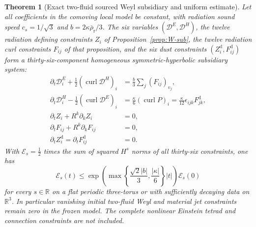 \documentclass[11pt,a4paper]{article}
\newtheorem{theorem}{Theorem}
\begin{document}
\begin{theorem}[Exact two-fluid sourced
Weyl subsidiary and uniform estimate]
\label{thm:36}
Let all coefficients in the
comoving local model be constant,
with radiation sound speed
$c_s=1/\sqrt3$ and
$b=2\kappa\bar\rho_{\mathrm r}/3$.
The six variables
$(\mathcal D^E,\mathcal D^H)$,
the twelve radiation defining
constraints $Z_i$ of
Proposition~\ref{prop:W-sub},
the twelve radiation curl constraints
$F_{ij}$ of that proposition,
and the six dust constraints
$(Z_i^{\mathrm d},F_{ij}^{\mathrm d})$
form a thirty-six-component
homogeneous symmetric-hyperbolic
subsidiary system:
\begin{equation}\label{eq:36subs}
\begin{aligned}
\partial_t\mathcal D^E_i
+\tfrac12(\operatorname{curl}\mathcal D^H)_i
&=\frac b3\sum_j(F_{ij})_{v_j},\\
\partial_t\mathcal D^H_i
-\tfrac12(\operatorname{curl}\mathcal D^E)_i
&=\frac\kappa6(\operatorname{curl}P)_i
=\frac\kappa{12}\epsilon_{ijk}F^{\mathrm d}_{jk},\\
\partial_tZ_i+R^k\partial_kZ_i&=0,\\
\partial_tF_{ij}+R^k\partial_kF_{ij}&=0,\\
\partial_tZ_i^{\mathrm d}
=\partial_tF_{ij}^{\mathrm d}&=0 .
\end{aligned}
\end{equation}
With $\mathcal E_s=\tfrac12$
times the sum of squared $H^s$
norms of all thirty-six
constraints, one has
\begin{equation}\label{eq:36energy}
\mathcal E_s(t)\le
\exp\!\left(
\max\left\{
\frac{\sqrt2|b|}{3},
\frac{|\kappa|}{6}
\right\}|t|\right)
\mathcal E_s(0)
\end{equation}
for every $s\in\mathbb R$ on
a flat periodic three-torus
or with sufficiently decaying
data on $\mathbb R^3$.
In particular vanishing initial
two-fluid Weyl and material
jet constraints remain zero
in the frozen model.
The complete nonlinear
Einstein tetrad and connection
constraints are not included.
\end{theorem}
\end{document}
